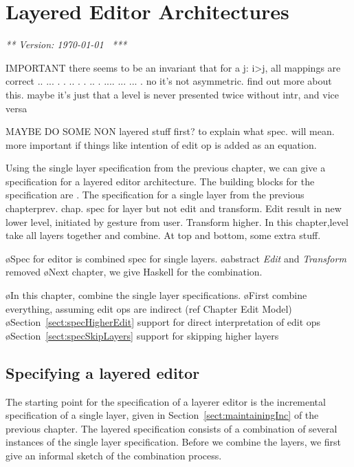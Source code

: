 \chapter{Layered Editor Architectures}
\label{chap:layeredArchs}
{\em *** Version: \today~ ***}


\bc

IMPORTANT there seems to be an invariant that for a j:  i>j, all mappings are correct 
  ..           ...       
 .  .    ..   .   .   .. 
.    ....  ...     ...  .
no it's not asymmetric. find out more about this.
maybe it's just that a level is never presented twice without intr, and vice versa


MAYBE DO SOME NON layered stuff first? to explain what spec. will mean. more important if things like intention of edit op is added as an equation.
\ec


\bc
Using the single layer specification from the previous chapter, we can give a specification for a layered editor architecture. The building blocks for the specification are . The specification for a single layer from the previous chapterprev. chap. spec for layer but not edit and transform. Edit result in new lower level, initiated by gesture from user. Transform higher. In this chapter,level take all layers together and combine. At top and bottom, some extra stuff.
\ec

\bl
\o Spec for editor is combined spec for single layers.
\o abstract {\em Edit} and {\em Transform} removed
\o Next chapter, we give Haskell for the combination.
\el

\bl
\o In this chapter, combine the single layer specifications.
\o First combine everything, assuming edit ops are indirect (ref Chapter Edit Model)
\o Section~\ref{sect:specHigherEdit} support for direct interpretation of edit ops
\o Section~\ref{sect:specSkipLayers} support for skipping higher layers
\el

\fromHere  %

\section{Specifying a layered editor}\label{sect:specCombination}

The starting point for the specification of a layerer editor is the incremental specification of a single layer, given in Section~\ref{sect:maintainingInc} of the previous chapter. The layered specification consists of a combination of several instances of the single layer specification. Before we combine the layers, we first give an informal sketch of the combination process.

